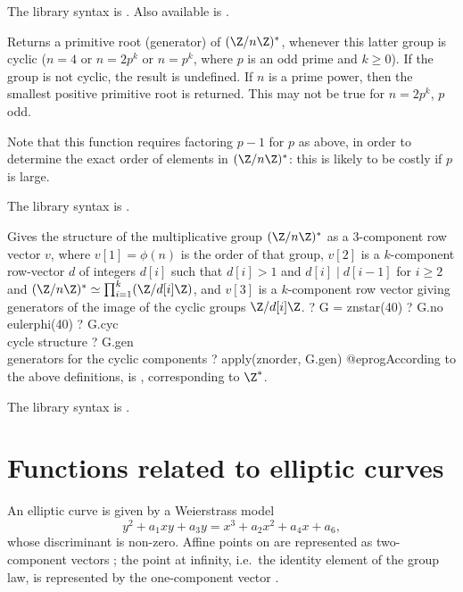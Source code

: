 The library syntax is .
Also available is .

\label{se:znprimroot}
Returns a primitive root (generator) of $(\Z/n\Z)^*$, whenever this
latter group is cyclic ($n = 4$ or $n = 2p^k$ or $n = p^k$, where $p$ is an
odd prime and $k \geq 0$). If the group is not cyclic, the result is
undefined. If $n$ is a prime power, then the smallest positive primitive
root is returned. This may not be true for $n = 2p^k$, $p$ odd.

Note that this function requires factoring $p-1$ for $p$ as above,
in order to determine the exact order of elements in
$(\Z/n\Z)^*$: this is likely to be costly if $p$ is large.

The library syntax is .

\label{se:znstar}
Gives the structure of the multiplicative group
$(\Z/n\Z)^*$ as a 3-component row vector $v$, where $v[1]=\phi(n)$ is the
order of that group, $v[2]$ is a $k$-component row-vector $d$ of integers
$d[i]$ such that $d[i]>1$ and $d[i]\mid d[i-1]$ for $i \ge 2$ and
$(\Z/n\Z)^* \simeq \prod_{i=1}^k(\Z/d[i]\Z)$, and $v[3]$ is a $k$-component row
vector giving generators of the image of the cyclic groups $\Z/d[i]\Z$.
\bprog
? G = znstar(40)
? G.no   \\ eulerphi(40)
? G.cyc  \\ cycle structure
? G.gen  \\ generators for the cyclic components
? apply(znorder, G.gen)
@eprog\noindent According to the above definitions,  is
\kbd{[2, [2], [-1]]}, corresponding to $\Z^*$.

The library syntax is .

\section{Functions related to elliptic curves}

An elliptic curve is given by a Weierstrass model
$$
  y^2+a_1xy+a_3y=x^3+a_2x^2+a_4x+a_6,
$$
whose discriminant is non-zero. Affine points on  are represented as
two-component vectors \kbd{[x,y]}; the point at infinity, i.e.~the identity
element of the group law, is represented by the one-component vector
\kbd{[0]}.


